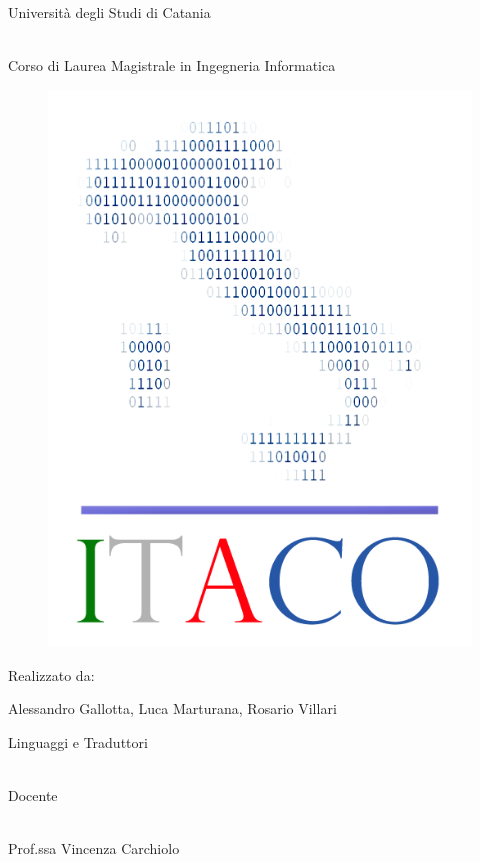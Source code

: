\documentclass[11pt, a4paper, twoside, notitlepage]{report}
\begin{document}
\begin{center}
\begin{Large}
Università degli Studi di Catania
\end{Large}
\begin{large}
\\Corso di Laurea Magistrale in Ingegneria Informatica
\end{large}
\vspace{30pt}

\begin{figure}[h] \hspace*{130pt}
\includegraphics[scale=0.35]{img/itaco_logo2.png}
\end{figure}
\vspace{30pt}
Realizzato da:\\
\begin{Large}
Alessandro Gallotta, Luca Marturana, Rosario Villari
\end{Large}
\vspace{30pt}

\begin{large}
Linguaggi e Traduttori
\end{large}
\\Docente
\begin{Large}
\\Prof.ssa Vincenza Carchiolo
\end{Large}

\vspace{20pt}
\vfill
\end{center}
\end{document}
